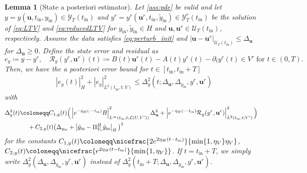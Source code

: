 \documentclass{m2an}
\newcommand{\bu}{\mathbf{u}}
\newcommand{\reduce}[1]{{{#1}^r}}
\newcommand{\tint}{t_{\mathrm{in}}}
\newcommand{\yint}{y_{\mathrm{in}}}
\newcommand{\tildeyint}{\tilde y_{\mathrm{in}}}
\newcommand{\mU}{{\mathscr U}}
\newcommand{\mY}{{\mathscr Y}}
\newcommand{\calL}{\mathcal{L}}
\newcommand{\calR}{\mathcal{R}}
\newcommand{\Res}{\calR}%
\newcommand{\norm}[2]{\left|#1\right|_{#2}}
\newtheorem{lemma}[thrm]{Lemma}
\begin{document}
\begin{lemma}[State a posteriori estimator]
    \label{Lemma:ResBasStateError}
    Let \cref{ass:pde} be valid and
    let $y=y(\bu,\tint,\yint)\in\mY_T(\tint)$ and $y^r=y^r(\bu^r ,\tint,\tildeyint)\in\mY^r_T(\tint)$ be the solution of \eqref{eq:LTV} and \eqref{eq:reducedLTV} for $\yint,\tildeyint \in H$ and $\bu,\bu^r\in\mU_T(\tint)$, respectively. Assume the data satisfies \eqref{eq:perturb_init} and ${\norm{\bu-\reduce\bu}{\mU_T(\tint)}}\leq\Delta_\bu$
    for $\Delta_\bu\geq 0$. Define the state error and residual as
    \begin{equation}\nonumber
        e_y\coloneqq y-\reduce y, \quad \Res_y(y^r,\bu^r)(t)\coloneqq B(t)\bu^r(t)-A(t)y^r(t)-\partial_t y^r(t) \in V' \text{ for }t\in(0,T).
    \end{equation}
    Then, we have the \emph{a posteriori} error bound for $t\in [\tint, \tint+T]$
    \begin{align}\label{eq:state_apost_CHL2V}
        &\norm{e_y(t)}{H}^2+\norm{e_y}{L^2(\tint,t;V)}^2\leq \Delta_y^2(t;\Delta_\bu, \Delta_{\yint}, y^r, \bu^r)
    \end{align}
    with
    \begin{align*}
        \Delta^2_{y}(t)&\coloneqq C_{1,y}(t)\Big(\norm{e^{-\eta_H (\cdot-\tint) }B}{L^\infty(\tint,t;\calL(U,V'))}^2{\Delta_\bu^2} + \norm{e^{-\eta_H (\cdot-\tint) }\Res_y(\reduce y, \reduce \bu)}{L^2(\tint,t;V')}^2\Big)\\
        &\hspace{1mm}\quad+ C_{2,y}(t){\big( \Delta_{\yint} + \norm{\tildeyint - \Pi^H_{V_r}\tildeyint }{H} \big)^2}
    \end{align*}
    for the constants $C_{1,y}(t)\coloneqq \nicefrac{2e^{2\eta_H(t-\tint)}}{\min\{1,\eta_V\}\eta_V}$, $C_{2,y}(t)\coloneqq \nicefrac{e^{2\eta_H(t-\tint)}}{\min\{1,\eta_V\}}$. If $t=\tint+T$, we simply write $\Delta_y^2(\Delta_\bu, \Delta_{\yint}, y^r, \bu^r)$ instead of $\Delta_y^2(\tint+T;\Delta_\bu, \Delta_{\yint}, y^r, \bu^r)$.
\end{lemma}
%
\end{document}
